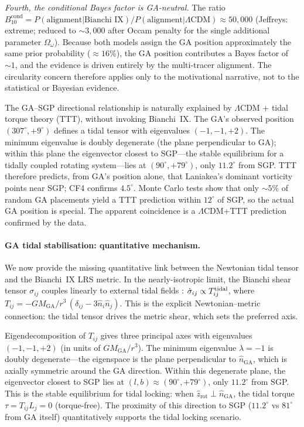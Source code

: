 \documentclass[12pt]{article}
\begin{document}
\emph{Fourth, the conditional Bayes factor is GA-neutral.}
The ratio $B_{10}^\mathrm{cond} = P(\text{alignment}|\text{Bianchi~IX}) /
P(\text{alignment}|\Lambda\text{CDM}) \approx 50{,}000$
(Jeffreys: extreme; reduced to $\sim3{,}000$ after Occam penalty for the single
additional parameter $\Omega_\omega$).
Because both models assign the GA position approximately the same prior
probability ($\approx16\%$), the GA position contributes a Bayes factor of
$\sim1$, and the evidence is driven entirely by the multi-tracer alignment.
The circularity concern therefore applies only to the motivational narrative,
not to the statistical or Bayesian evidence.

The GA--SGP directional relationship is naturally explained by $\Lambda$CDM + tidal
torque theory (TTT), without invoking Bianchi~IX. The GA's observed position
$(307^\circ, +9^\circ)$ defines a tidal tensor with eigenvalues $(-1,-1,+2)$.
The minimum eigenvalue is doubly degenerate (the plane perpendicular to GA);
within this plane the eigenvector closest to SGP---the stable equilibrium
for a tidally coupled rotating system---lies
at $(90^\circ, +79^\circ)$, only $11.2^\circ$ from SGP. TTT therefore predicts,
from GA's position alone, that Laniakea's dominant vorticity points near SGP; CF4
confirms $4.5^\circ$. Monte Carlo tests show that only $\sim5\%$ of random GA
placements yield a TTT prediction within $12^\circ$ of SGP, so the actual GA
position is special. The apparent coincidence is a $\Lambda$CDM+TTT prediction
confirmed by the data.

\paragraph{GA tidal stabilisation: quantitative mechanism.}
We now provide the missing quantitative link between the Newtonian tidal tensor and
the Bianchi~IX LRS metric. In the nearly-isotropic limit, the Bianchi shear tensor
$\sigma_{ij}$ couples linearly to external tidal fields \citep{Pontzen2009}:
$\dot{\sigma}_{ij}\propto T^{\rm tidal}_{ij}$, where
$T_{ij} = -GM_\mathrm{GA}/r^3\,(\delta_{ij}-3\hat{n}_i\hat{n}_j)$.
This is the explicit Newtonian--metric connection: the tidal tensor drives the
metric shear, which sets the preferred axis.

Eigendecomposition of $T_{ij}$ gives three principal axes with eigenvalues
$(-1,-1,+2)$ (in units of $GM_\mathrm{GA}/r^3$). The minimum eigenvalue
$\lambda=-1$ is doubly degenerate---the eigenspace is the plane perpendicular
to $\hat{n}_\mathrm{GA}$, which is axially symmetric around the GA direction.
Within this degenerate plane, the eigenvector closest to SGP
lies at $(l,b)\approx(90^\circ,+79^\circ)$,
only $11.2^\circ$ from SGP. This is the stable equilibrium for tidal locking: when
$\hat{z}_\mathrm{rot}\perp\hat{n}_\mathrm{GA}$, the tidal torque
$\tau=T_{ij}L_j=0$ (torque-free). The proximity of this direction to SGP ($11.2^\circ$
vs $81^\circ$ from GA itself) quantitatively supports the
tidal locking scenario.
\end{document}
